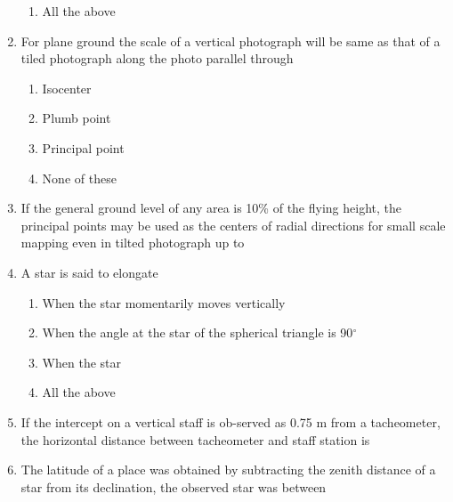 \documentclass[11pt,a4paper]{article}
\begin{document}
\begin{enumerate}
\begin{enumerate}[label=\Alph*.]
\item{All the above}
\end{enumerate}
\item{For plane ground the scale of a vertical photograph will be same as that of a tiled photograph along the photo parallel through}
\begin{enumerate}[label=\Alph*.]
\item{Isocenter}
\item{Plumb point}
\item{Principal point}
\item{None of these}
\end{enumerate}
\item{If the general ground level of any area is 10\% of the flying height, the principal points may be used as the centers of radial directions for small scale mapping even in tilted photograph up to}
\\
\item{A star is said to elongate}
\begin{enumerate}[label=\Alph*.]
\item{When the star momentarily moves vertically}
\item{When the angle at the star of the spherical triangle is 90$^\circ$}
\item{When the star}
\item{All the above}
\end{enumerate}
\item{If the intercept on a vertical staff is ob-served as 0.75 m from a tacheometer, the horizontal distance between tacheometer and staff station is}
\\
\item{The latitude of a place was obtained by subtracting the zenith distance of a star from its declination, the observed star was between}

\end{enumerate}
\end{document}
